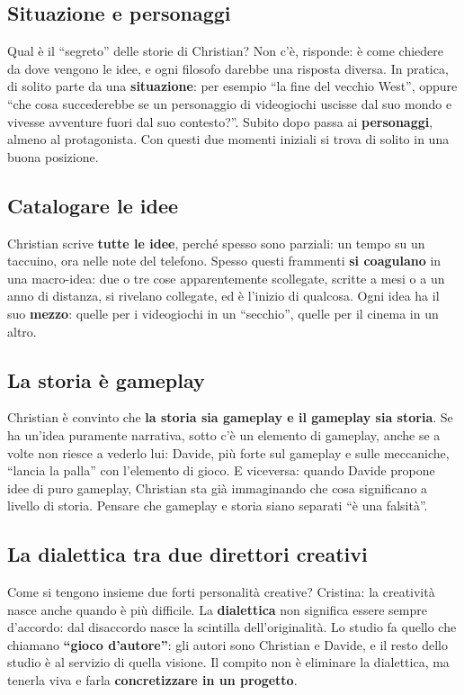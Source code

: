 \subsection{Situazione e personaggi}

Qual è il ``segreto'' delle storie di Christian? Non c'è, risponde: è come chiedere
da dove vengono le idee, e ogni filosofo darebbe una risposta diversa. In pratica,
di solito parte da una \textbf{situazione}: per esempio ``la fine del vecchio West'',
oppure ``che cosa succederebbe se un personaggio di videogiochi uscisse dal suo
mondo e vivesse avventure fuori dal suo contesto?''. Subito dopo passa ai
\textbf{personaggi}, almeno al protagonista. Con questi due momenti iniziali si
trova di solito in una buona posizione.

\subsection{Catalogare le idee}

Christian scrive \textbf{tutte le idee}, perché spesso sono parziali: un tempo su un
taccuino, ora nelle note del telefono. Spesso questi frammenti
\textbf{si coagulano} in una macro-idea: due o tre cose apparentemente scollegate,
scritte a mesi o a un anno di distanza, si rivelano collegate, ed è l'inizio di
qualcosa. Ogni idea ha il suo \textbf{mezzo}: quelle per i videogiochi in un
``secchio'', quelle per il cinema in un altro.

\subsection{La storia è gameplay}

Christian è convinto che \textbf{la storia sia gameplay e il gameplay sia storia}.
Se ha un'idea puramente narrativa, sotto c'è un elemento di gameplay, anche se a
volte non riesce a vederlo lui: Davide, più forte sul gameplay e sulle meccaniche,
``lancia la palla'' con l'elemento di gioco. E viceversa: quando Davide propone
idee di puro gameplay, Christian sta già immaginando che cosa significano a livello
di storia. Pensare che gameplay e storia siano separati ``è una falsità''.

\subsection{La dialettica tra due direttori creativi}

Come si tengono insieme due forti personalità creative? Cristina: la creatività
nasce anche quando è più difficile. La \textbf{dialettica} non significa essere
sempre d'accordo: dal disaccordo nasce la scintilla dell'originalità. Lo studio fa
quello che chiamano \textbf{``gioco d'autore''}: gli autori sono Christian e Davide,
e il resto dello studio è al servizio di quella visione. Il compito non è
eliminare la dialettica, ma tenerla viva e farla \textbf{concretizzare in un
progetto}.

